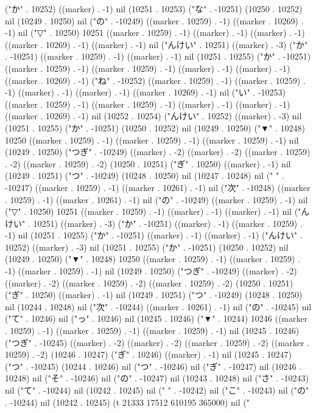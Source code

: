 ("か" . 10252) ((marker) . -1) nil (10251 . 10253) ("な" . -10251) (10250 . 10252) nil (10249 . 10250) nil ("の" . -10249) ((marker . 10259) . -1) ((marker . 10269) . -1) nil ("▽" . 10250) 10251 ((marker . 10259) . -1) ((marker) . -1) ((marker) . -1) ((marker . 10269) . -1) ((marker) . -1) nil ("んけい" . 10251) ((marker) . -3) ("か" . -10251) ((marker . 10259) . -1) ((marker) . -1) nil (10251 . 10255) ("か" . -10251) ((marker . 10259) . -1) ((marker . 10259) . -1) ((marker) . -1) ((marker) . -1) ((marker . 10269) . -1) ("ね" . -10252) ((marker . 10259) . -1) ((marker . 10259) . -1) ((marker) . -1) ((marker) . -1) ((marker . 10269) . -1) nil ("い" . -10253) ((marker . 10259) . -1) ((marker . 10259) . -1) ((marker) . -1) ((marker) . -1) ((marker . 10269) . -1) nil (10252 . 10254) ("んけい" . 10252) ((marker) . -3) nil (10251 . 10255) ("か" . -10251) (10250 . 10252) nil (10249 . 10250) ("▼" . 10248) 10250 ((marker . 10259) . -1) ((marker . 10259) . -1) ((marker . 10259) . -1) nil (10249 . 10250) ("つぎ" . -10249) ((marker) . -2) ((marker) . -2) ((marker . 10259) . -2) ((marker . 10259) . -2) (10250 . 10251) ("ぎ" . 10250) ((marker) . -1) nil (10249 . 10251) ("つ" . -10249) (10248 . 10250) nil (10247 . 10248) nil (" " . -10247) ((marker . 10259) . -1) ((marker . 10261) . -1) nil ("次" . -10248) ((marker . 10259) . -1) ((marker . 10261) . -1) nil ("の" . -10249) ((marker . 10259) . -1) nil ("▽" . 10250) 10251 ((marker . 10259) . -1) ((marker) . -1) ((marker) . -1) nil ("んけい" . 10251) ((marker) . -3) ("か" . -10251) ((marker) . -1) ((marker . 10259) . -1) nil (10251 . 10255) ("か" . -10251) ((marker) . -1) ((marker) . -1) ("んけい" . 10252) ((marker) . -3) nil (10251 . 10255) ("か" . -10251) (10250 . 10252) nil (10249 . 10250) ("▼" . 10248) 10250 ((marker . 10259) . -1) ((marker . 10259) . -1) ((marker . 10259) . -1) nil (10249 . 10250) ("つぎ" . -10249) ((marker) . -2) ((marker) . -2) ((marker . 10259) . -2) ((marker . 10259) . -2) (10250 . 10251) ("ぎ" . 10250) ((marker) . -1) nil (10249 . 10251) ("つ" . -10249) (10248 . 10250) nil (10244 . 10248) nil ("次" . -10244) ((marker . 10261) . -1) nil ("の" . -10245) nil ("て" . 10246) nil ("っ" . 10246) nil (10245 . 10246) ("▼" . 10244) 10246 ((marker . 10259) . -1) ((marker . 10259) . -1) ((marker . 10259) . -1) nil (10245 . 10246) ("つぎ" . -10245) ((marker) . -2) ((marker) . -2) ((marker . 10259) . -2) ((marker . 10259) . -2) (10246 . 10247) ("ぎ" . 10246) ((marker) . -1) nil (10245 . 10247) ("つ" . -10245) (10244 . 10246) nil ("つ" . -10246) nil ("ぎ" . -10247) nil (10246 . 10248) nil ("そ" . -10246) nil ("の" . -10247) nil (10243 . 10248) nil ("さ" . -10243) nil ("て" . -10244) nil (10242 . 10245) nil (" " . -10242) nil ("こ" . -10243) nil ("の" . -10244) nil (10242 . 10245) (t 21333 17512 610195 365000) nil ("
